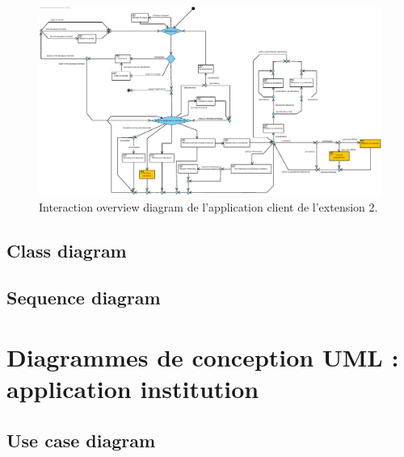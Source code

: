 \documentclass[]{report}
\begin{document}
\begin{figure}[h]
	\centering\includegraphics[width=\linewidth]{img/Interaction Overview Client - Extension 2.pdf}
	\caption{Interaction overview diagram de l'application client de l'extension 2.}
\end{figure}


\newpage

\subsection{Class diagram}

\newpage

\subsection{Sequence diagram}

\newpage



\section{Diagrammes de conception UML : application institution}



\subsection{Use case diagram}
\end{document}

